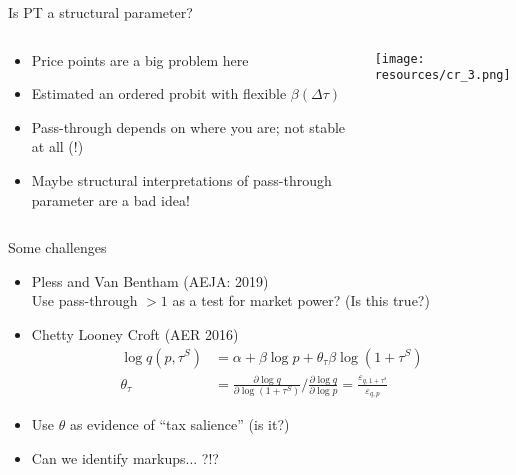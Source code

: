 \begin{frame}{Is PT a structural parameter?}
\begin{columns}
\begin{column}{0.5\textwidth}
\begin{itemize}
\item Price points are a big problem here
\item Estimated an ordered probit with flexible $\beta(\Delta \tau)$
\item Pass-through depends on where you are; not stable at all (!)
\item Maybe structural interpretations of pass-through parameter are a bad idea!
\end{itemize}
\end{column}
\begin{column}{0.5\textwidth}
\texttt{[image: resources/cr\_3.png]}
\end{column}
\end{columns}
\end{frame}

\begin{frame}{Some challenges}
\begin{itemize}
\item Pless and Van Bentham (AEJA: 2019)\\
 Use pass-through $>1$ as a test for market power? (Is this true?)
\item Chetty Looney Croft (AER 2016)
\begin{align*}
\log q\left(p, \tau^S\right)&=\alpha+\beta \log p+\theta_\tau \beta \log \left(1+\tau^S\right)\\
\theta_\tau&=\frac{\partial \log q}{\partial \log \left(1+\tau^S\right)} / \frac{\partial \log q}{\partial \log p}=\frac{\varepsilon_{q, 1+\tau^s}}{\varepsilon_{q, p}}
\end{align*}
\item Use $\theta$ as evidence of ``tax salience'' (is it?)
\item Can we identify markups... ?!?
\end{itemize}
\end{frame}




